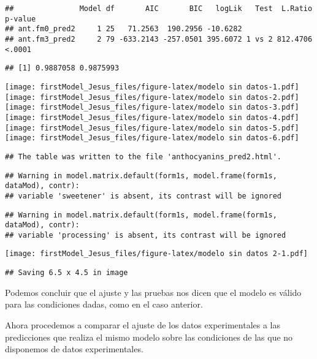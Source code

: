 \documentclass[
]{article}
\begin{document}
\begin{verbatim}
##               Model df       AIC       BIC   logLik   Test  L.Ratio p-value
## ant.fm0_pred2     1 25   71.2563  190.2956 -10.6282                        
## ant.fm3_pred2     2 79 -633.2143 -257.0501 395.6072 1 vs 2 812.4706  <.0001
\end{verbatim}

\begin{verbatim}
## [1] 0.9887058 0.9875993
\end{verbatim}

\texttt{[image: firstModel\_Jesus\_files/figure-latex/modelo sin datos-1.pdf]}
\texttt{[image: firstModel\_Jesus\_files/figure-latex/modelo sin datos-2.pdf]}
\texttt{[image: firstModel\_Jesus\_files/figure-latex/modelo sin datos-3.pdf]}
\texttt{[image: firstModel\_Jesus\_files/figure-latex/modelo sin datos-4.pdf]}
\texttt{[image: firstModel\_Jesus\_files/figure-latex/modelo sin datos-5.pdf]}
\texttt{[image: firstModel\_Jesus\_files/figure-latex/modelo sin datos-6.pdf]}

\begin{verbatim}
## The table was written to the file 'anthocyanins_pred2.html'.
\end{verbatim}

\begin{verbatim}
## Warning in model.matrix.default(form1s, model.frame(form1s, dataMod), contr):
## variable 'sweetener' is absent, its contrast will be ignored
\end{verbatim}

\begin{verbatim}
## Warning in model.matrix.default(form1s, model.frame(form1s, dataMod), contr):
## variable 'processing' is absent, its contrast will be ignored
\end{verbatim}

\texttt{[image: firstModel\_Jesus\_files/figure-latex/modelo sin datos 2-1.pdf]}

\begin{verbatim}
## Saving 6.5 x 4.5 in image
\end{verbatim}

Podemos concluir que el ajuste y las pruebas nos dicen que el modelo es
válido para las condiciones dadas, como en el caso anterior.

Ahora procedemos a comparar el ajuste de los datos experimentales a las
predicciones que realiza el mismo modelo sobre las condiciones de las
que no disponemos de datos experimentales.
\end{document}
